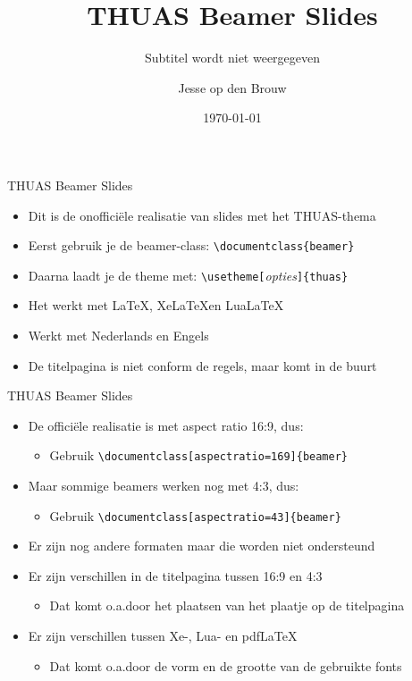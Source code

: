 \documentclass[fleqn,aspectratio=169,dutch]{beamer}
\title{THUAS Beamer Slides}
\subtitle{Subtitel wordt niet weergegeven}
\author{Jesse op den Brouw}
\date{\today}
\begin{document}
\maketitle

\begin{frame}[fragile]{THUAS Beamer Slides}
\begin{itemize}
\item Dit is de onofficiële realisatie van slides met het THUAS-thema
\item Eerst gebruik je de beamer-class: \lstinline|\documentclass{beamer}|
\item Daarna laadt je de theme met: \lstinline|\usetheme[|\emph{\small opties}\lstinline|]{thuas}|
\item Het werkt met \LaTeX, Xe\LaTeX en Lua\LaTeX
\item Werkt met Nederlands en Engels
\item De titelpagina is niet conform de regels, maar komt in de buurt
\end{itemize}
\end{frame}

\begin{frame}[fragile]{THUAS Beamer Slides}
\begin{itemize}
\item De officiële realisatie is met aspect ratio 16:9, dus:
\begin{itemize}
\item Gebruik \lstinline|\documentclass[aspectratio=169]{beamer}|
\end{itemize}
\item Maar sommige beamers werken nog met 4:3, dus:
\begin{itemize}
\item Gebruik \lstinline|\documentclass[aspectratio=43]{beamer}|
\end{itemize}
\item Er zijn nog andere formaten maar die worden niet ondersteund
\item Er zijn verschillen in de titelpagina tussen 16:9 en 4:3
\begin{itemize}
\item Dat komt o.a.\@ door het plaatsen van het plaatje op de titelpagina
\end{itemize}
\item Er zijn verschillen tussen Xe-, Lua- en pdf\LaTeX
\begin{itemize}
\item Dat komt o.a.\@ door de vorm en de grootte van de gebruikte fonts
\end{itemize}
\end{itemize}
\end{frame}
\end{document}
